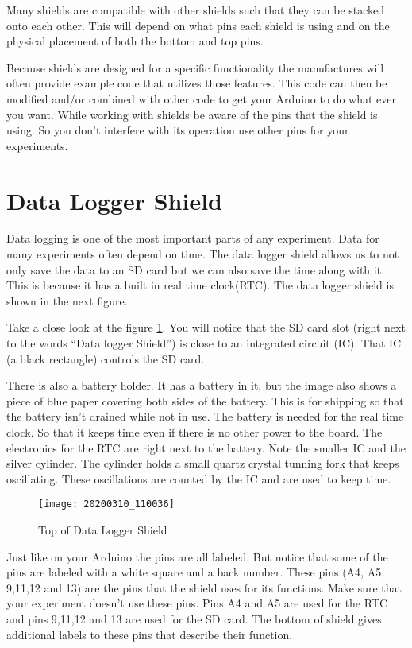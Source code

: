 	Many shields are compatible with other shields such that they can be stacked onto each other. This will depend on what pins each shield is using and on the physical placement of both the bottom and top pins.
	
	Because shields are designed for a specific functionality the manufactures will often provide example code that utilizes those features. This code can then be modified and/or combined with other code to get your Arduino to do what ever you want. While working with shields be aware of the pins that the shield is using. So you don't interfere with its operation use other pins for your experiments.

\section{Data Logger Shield}
	Data logging is one of the most important parts of any experiment. Data for many experiments often depend on time. The data logger shield allows us to not only save the data to an SD card but we can also save the time along with it. This is because it has a built in real time clock(RTC). The data logger shield is shown in the next figure.
	
	Take a close look at the figure \ref{Data_Logger}. You will notice that the SD card slot (right next to the words ``Data logger Shield'') is close to an integrated circuit (IC). That IC (a black rectangle) controls the SD card. 
	
	There is also a battery holder. It has a battery in it, but the image also shows a piece of blue paper covering both sides of the battery. This is for shipping so that the battery isn't drained while not in use. The battery is needed for the real time clock. So that it keeps time even if there is no other power to the board. The electronics for the RTC are right next to the battery. Note the smaller IC and the silver cylinder. The cylinder holds a small quartz crystal tunning fork that keeps oscillating. These oscillations are counted by the IC and are used to keep time. 
	\begin{figure}[h!] 
		\centering
		\caption{Top of Data Logger Shield}
		\label{Data_Logger}
		\texttt{[image: 20200310\_110036]}
	\end{figure}
	
	Just like on your Arduino the pins are all labeled. But notice that some of the pins are labeled with a white square and a back number. These pins (A4, A5, 9,11,12 and 13) are the pins that the shield uses for its functions. Make sure that your experiment doesn't use these pins. Pins A4 and A5 are used for the RTC and pins 9,11,12 and 13 are used for the SD card. The bottom of shield gives additional labels to these pins that describe their function. 




